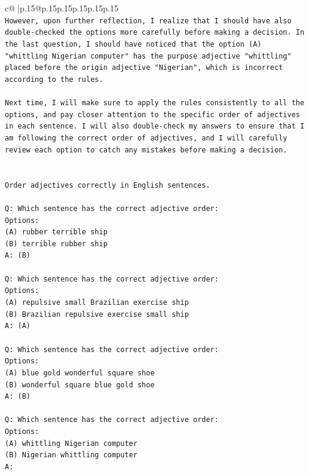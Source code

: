 \documentclass{article}
\begin{document}
{\begin{supertabular}{c@{$\;$}|p{.15\linewidth}@{}p{.15\linewidth}p{.15\linewidth}p{.15\linewidth}p{.15\linewidth}p{.15\linewidth}}
{{{\\ 
\texttt{However, upon further reflection, I realize that I should have also double{-}checked the options more carefully before making a decision. In the last question, I should have noticed that the option (A) "whittling Nigerian computer" has the purpose adjective "whittling" placed before the origin adjective "Nigerian", which is incorrect according to the rules.} \\
\\ 
\texttt{Next time, I will make sure to apply the rules consistently to all the options, and pay closer attention to the specific order of adjectives in each sentence. I will also double{-}check my answers to ensure that I am following the correct order of adjectives, and I will carefully review each option to catch any mistakes before making a decision.} \\
\\ 
\\ 
\texttt{Order adjectives correctly in English sentences.} \\
\\ 
\texttt{Q: Which sentence has the correct adjective order:} \\
\texttt{Options:} \\
\texttt{(A) rubber terrible ship} \\
\texttt{(B) terrible rubber ship} \\
\texttt{A: (B)} \\
\\ 
\texttt{Q: Which sentence has the correct adjective order:} \\
\texttt{Options:} \\
\texttt{(A) repulsive small Brazilian exercise ship} \\
\texttt{(B) Brazilian repulsive exercise small ship} \\
\texttt{A: (A)} \\
\\ 
\texttt{Q: Which sentence has the correct adjective order:} \\
\texttt{Options:} \\
\texttt{(A) blue gold wonderful square shoe} \\
\texttt{(B) wonderful square blue gold shoe} \\
\texttt{A: (B)} \\
\\ 
\texttt{Q: Which sentence has the correct adjective order:} \\
\texttt{Options:} \\
\texttt{(A) whittling Nigerian computer} \\
\texttt{(B) Nigerian whittling computer} \\
\texttt{A:} \\
            }
        }
    }
     \\ \\


\end{supertabular}}
\end{document}
